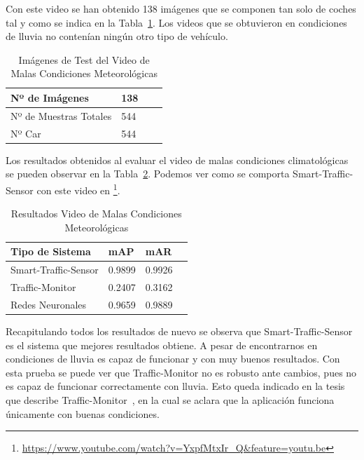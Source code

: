 Con este video se han obtenido 138 imágenes que se componen tan solo de coches tal y como se indica en la Tabla~\ref{tabla_video_malas_condiciones}. Los videos que se obtuvieron en condiciones de lluvia no contenían ningún otro tipo de vehículo.

\begin{table}[htbp]
\begin{center}
\begin{tabular}{|l|l|l|l|}
\hline
Nº de Imágenes  & 138 \\
\hline \hline
Nº de Muestras Totales & 544\\ \hline
Nº Car & 544 \\ \hline
\end{tabular}
\caption{Imágenes de Test del Video de Malas Condiciones Meteorológicas}
\label{tabla_video_malas_condiciones}
\end{center}
\end{table}

Los resultados obtenidos al evaluar el video de malas condiciones climatológicas se pueden observar en la Tabla~\ref{resultados_video_malas_condiciones}. Podemos ver como se comporta Smart-Traffic-Sensor con este video en \footnote{\url{https://www.youtube.com/watch?v=YxpfMtxIr_Q&feature=youtu.be}}.

\begin{table}[htbp]
\begin{center}
\begin{tabular}{|l|l|l|l|}
\hline
Tipo de Sistema & mAP & mAR  \\ 
\hline \hline
Smart-Traffic-Sensor & 0.9899 & 0.9926 \\ \hline
Traffic-Monitor & 0.2407 & 0.3162 \\ \hline
Redes Neuronales & 0.9659 & 0.9889\\ \hline
\end{tabular}
\caption{Resultados Video de Malas Condiciones Meteorológicas}
\label{resultados_video_malas_condiciones}
\end{center}
\end{table}

Recapitulando todos los resultados de nuevo se observa que Smart-Traffic-Sensor es el sistema que mejores resultados obtiene. A pesar de encontrarnos en condiciones de lluvia es capaz de funcionar y con muy buenos resultados. Con esta prueba se puede ver que Traffic-Monitor no es robusto ante cambios, pues no es capaz de funcionar correctamente con lluvia. Esto queda indicado en la tesis que describe Traffic-Monitor~\cite{redo_tesis}, en la cual se aclara que la aplicación funciona únicamente con buenas condiciones.

